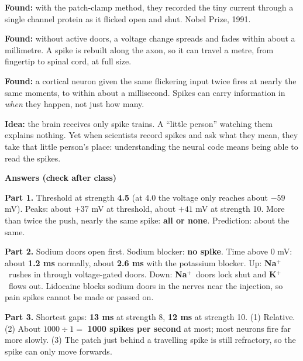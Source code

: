 \documentclass[12pt,a4paper]{article}
\newcommand{\pagehead}[1]{{\color{kprimary}\LARGE\bfseries #1}\par\vspace{2pt}{\color{kaccent}\rule{\linewidth}{1.2pt}}\par\vspace{4pt}}
\newcommand{\Na}{\textcolor{cNa}{\textbf{Na$^{+}$}}}
\newcommand{\K}{\textcolor{cK}{\textbf{K$^{+}$}}}
\begin{document}
\begin{studycard}[title={Neher and Sakmann: one door at a time (1976)}]
\textbf{Found:} with the patch-clamp method, they recorded the tiny current through a single channel protein as it flicked open and shut. Nobel Prize, 1991.
\end{studycard}

\begin{studycard}[title={Why spikes? (Hodgkin and Rushton, 1946)}]
\textbf{Found:} without active doors, a voltage change spreads and fades within about a millimetre. A spike is rebuilt along the axon, so it can travel a metre, from fingertip to spinal cord, at full size.
\end{studycard}

\begin{studycard}[title={Timing matters too (Mainen and Sejnowski, 1995)}]
\textbf{Found:} a cortical neuron given the same flickering input twice fires at nearly the same moments, to within about a millisecond. Spikes can carry information in \emph{when} they happen, not just how many.
\end{studycard}

\begin{studycard}[title={The homunculus (Rieke et al., 1997)}]
\textbf{Idea:} the brain receives only spike trains. A ``little person'' watching them explains nothing. Yet when scientists record spikes and ask what they mean, they take that little person's place: understanding the neural code means being able to read the spikes.
\end{studycard}

\newpage
\pagehead{Answers (check after class)}

\textbf{Part 1.} Threshold at strength \textbf{4.5} (at 4.0 the voltage only reaches about $-59$ mV). Peaks: about $+37$ mV at threshold, about $+41$ mV at strength 10. More than twice the push, nearly the same spike: \textbf{all or none}. Prediction: about the same.

\textbf{Part 2.} Sodium doors open first. Sodium blocker: \textbf{no spike}. Time above 0 mV: about \textbf{1.2 ms} normally, about \textbf{2.6 ms} with the potassium blocker. Up: \Na\ rushes in through voltage-gated doors. Down: \Na\ doors lock shut and \K\ flows out. Lidocaine blocks sodium doors in the nerves near the injection, so pain spikes cannot be made or passed on.

\textbf{Part 3.} Shortest gaps: \textbf{13 ms} at strength 8, \textbf{12 ms} at strength 10. (1) Relative. (2) About $1000 \div 1 = $ \textbf{1000 spikes per second} at most; most neurons fire far more slowly. (3) The patch just behind a travelling spike is still refractory, so the spike can only move forwards.
\end{document}
